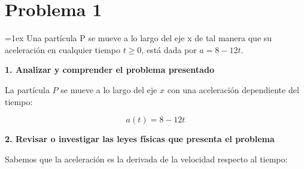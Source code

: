 \documentclass[answers]{exam}
\edef\svparindent{\the\parindent}
\newenvironment{specindent}
  {\par\everypar{\leftskip=\svparindent\relax}\parindent=0pt\relax\parskip=1ex}
  {\vspace{\parskip}\par}
\begin{document}


\section*{Problema 1}

\begin{specindent}
	Una partícula P se mueve a lo largo del eje x de tal manera que su aceleración en cualquier tiempo $t \ge 0$, está dada por $a = 8 - 12 t$.
\end{specindent}

\vspace{0.5em}


\textbf{1. Analizar y comprender el problema presentado}

La partícula \( P \) se mueve a lo largo del eje \( x \) con una aceleración dependiente del tiempo:

\[
	a(t) = 8 - 12t
\]


\vspace{0.3cm}
\textbf{2. Revisar o investigar las leyes físicas que presenta el problema}

Sabemos que la aceleración es la derivada de la velocidad respecto al tiempo:
\end{document}
